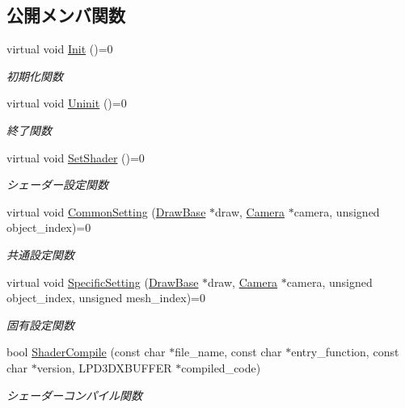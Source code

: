 \subsection*{公開メンバ関数}
\begin{DoxyCompactItemize}
\item 
virtual void \mbox{\hyperlink{class_shader_base_a9622b2f5e0184a78d3af82820dc5113d}{Init}} ()=0
\begin{DoxyCompactList}\small\item\em 初期化関数 \end{DoxyCompactList}\item 
virtual void \mbox{\hyperlink{class_shader_base_a784edfa81bec4d08a257ed4f02c61222}{Uninit}} ()=0
\begin{DoxyCompactList}\small\item\em 終了関数 \end{DoxyCompactList}\item 
virtual void \mbox{\hyperlink{class_shader_base_af45063254b80602db8626360d643baee}{Set\+Shader}} ()=0
\begin{DoxyCompactList}\small\item\em シェーダー設定関数 \end{DoxyCompactList}\item 
virtual void \mbox{\hyperlink{class_shader_base_aef6fa922223d71fbec81464ebbfaf687}{Common\+Setting}} (\mbox{\hyperlink{class_draw_base}{Draw\+Base}} $\ast$draw, \mbox{\hyperlink{class_camera}{Camera}} $\ast$camera, unsigned object\+\_\+index)=0
\begin{DoxyCompactList}\small\item\em 共通設定関数 \end{DoxyCompactList}\item 
virtual void \mbox{\hyperlink{class_shader_base_ac78c78ede3b8e48cf28b739b97456620}{Specific\+Setting}} (\mbox{\hyperlink{class_draw_base}{Draw\+Base}} $\ast$draw, \mbox{\hyperlink{class_camera}{Camera}} $\ast$camera, unsigned object\+\_\+index, unsigned mesh\+\_\+index)=0
\begin{DoxyCompactList}\small\item\em 固有設定関数 \end{DoxyCompactList}\item 
bool \mbox{\hyperlink{class_shader_base_ac6e791440374f97592cfb4cb36f4fa55}{Shader\+Compile}} (const char $\ast$file\+\_\+name, const char $\ast$entry\+\_\+function, const char $\ast$version, L\+P\+D3\+D\+X\+B\+U\+F\+F\+ER $\ast$compiled\+\_\+code)
\begin{DoxyCompactList}\small\item\em シェーダーコンパイル関数 \end{DoxyCompactList}\item 

\end{DoxyCompactItemize}
